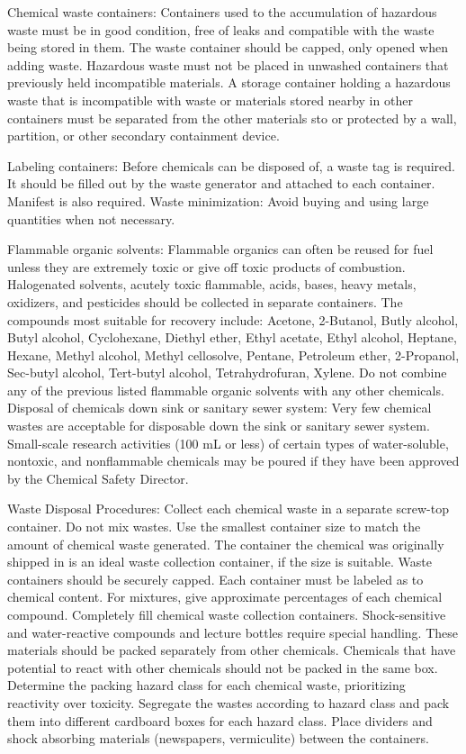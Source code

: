 \documentclass[12pt]{../SOP2}
\begin{document}
\NP Chemical waste containers: Containers used to the accumulation of hazardous waste must be in good condition, free of leaks and compatible with the waste being stored in them. The waste container should be capped, only opened when adding waste. Hazardous waste must not be placed in unwashed containers that previously held incompatible materials.  A storage container holding a hazardous waste that is incompatible with waste or materials stored nearby in other containers must be separated from the other materials  sto or protected by a wall, partition, or other secondary containment device. 

\NP Labeling containers: Before chemicals can be disposed of, a waste tag is required. It should be filled out by the waste generator and attached to each container. Manifest is also required. 
\NP Waste minimization: Avoid buying and using large quantities when not necessary. 

\NP Flammable organic solvents: Flammable organics can often be reused for fuel unless they are extremely toxic or give off toxic products of combustion. Halogenated solvents, acutely toxic flammable, acids, bases, heavy metals, oxidizers, and pesticides should be collected in separate containers. The compounds most suitable for recovery include: Acetone, 2-Butanol, Butly alcohol, Butyl alcohol, Cyclohexane, Diethyl ether, Ethyl acetate, Ethyl alcohol, Heptane, Hexane, Methyl alcohol, Methyl cellosolve, Pentane, Petroleum ether, 2-Propanol, Sec-butyl alcohol, Tert-butyl alcohol, Tetrahydrofuran, Xylene. Do not combine any of the previous listed flammable organic solvents with any other chemicals. 
Disposal of chemicals down sink or sanitary sewer system:
Very few chemical wastes are acceptable for disposable down the sink or sanitary sewer system. Small-scale research activities (100 mL or less) of certain types of water-soluble, nontoxic, and nonflammable chemicals may be poured if they have been approved by the Chemical Safety Director. 

\NP Waste Disposal Procedures:
Collect each chemical waste in a separate screw-top container. Do not mix wastes. Use the smallest container size to match the amount of chemical waste generated. The container the chemical was originally shipped in is an ideal waste collection container, if the size is suitable. Waste containers should be securely capped. Each container must be labeled as to chemical content. For mixtures, give approximate percentages of each chemical compound. Completely fill chemical waste collection containers. Shock-sensitive and water-reactive compounds and lecture bottles require special handling. These materials should be packed separately from other chemicals. Chemicals that have potential to react with other chemicals should not be packed in the same box. Determine the packing hazard class for each chemical waste, prioritizing reactivity over toxicity. Segregate the wastes according to hazard class and pack them into different cardboard boxes for each hazard class. Place dividers and shock absorbing materials (newspapers, vermiculite) between the containers. 
\end{document}
